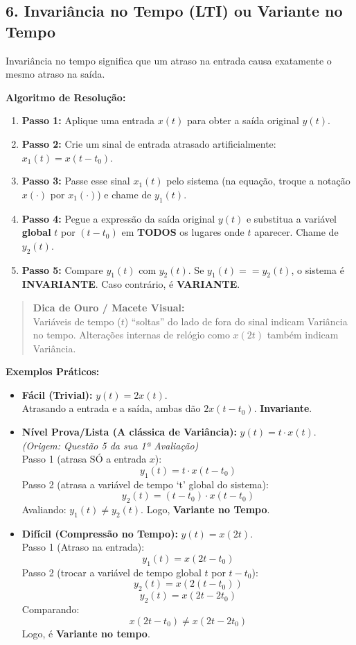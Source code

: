 \subsection{6. Invariância no Tempo (LTI) ou Variante no Tempo}\label{invariuxe2ncia-no-tempo-lti-ou-variante-no-tempo}

Invariância no tempo significa que um atraso na entrada causa exatamente o mesmo atraso na saída.

\textbf{Algoritmo de Resolução:}

\begin{enumerate}
\def\labelenumi{\arabic{enumi}.}
\tightlist
\item
  \textbf{Passo 1:} Aplique uma entrada \(x(t)\) para obter a saída original \(y(t)\).
\item
  \textbf{Passo 2:} Crie um sinal de entrada atrasado artificialmente: \(x_1(t) = x(t - t_0)\).
\item
  \textbf{Passo 3:} Passe esse sinal \(x_1(t)\) pelo sistema (na equação, troque a notação \(x(\cdot)\) por \(x_1(\cdot)\)) e chame de \(y_1(t)\).
\item
  \textbf{Passo 4:} Pegue a expressão da saída original \(y(t)\) e substitua a variável \textbf{global} \(t\) por \((t - t_0)\) em \textbf{TODOS} os lugares onde \(t\) aparecer. Chame de \(y_2(t)\).
\item
  \textbf{Passo 5:} Compare \(y_1(t)\) com \(y_2(t)\). Se \(y_1(t) == y_2(t)\), o sistema é \textbf{INVARIANTE}. Caso contrário, é \textbf{VARIANTE}.
\end{enumerate}

\begin{quote}
\textbf{Dica de Ouro / Macete Visual:}\\
Variáveis de tempo (\(t\)) ``soltas'' do lado de fora do sinal indicam Variância no tempo. Alterações internas de relógio como \(x(2t)\) também indicam Variância.
\end{quote}

\textbf{Exemplos Práticos:}

\begin{itemize}
\item
  \textbf{Fácil (Trivial):} \(y(t) = 2x(t)\).\\
  Atrasando a entrada e a saída, ambas dão \(2x(t-t_0)\). \textbf{Invariante}.
\item
  \textbf{Nível Prova/Lista (A clássica de Variância):} \(y(t) = t \cdot x(t)\).\\
  \emph{(Origem: Questão 5 da sua 1ª Avaliação)}\\
  Passo 1 (atrasa SÓ a entrada \(x\)):
  \[y_1(t) = t \cdot x(t-t_0)\]
  Passo 2 (atrasa a variável de tempo `t' global do sistema):
  \[y_2(t) = (t-t_0) \cdot x(t-t_0)\]
  Avaliando: \(y_1(t) \neq y_2(t)\). Logo, \textbf{Variante no Tempo}.
\item
  \textbf{Difícil (Compressão no Tempo):} \(y(t) = x(2t)\).\\
  Passo 1 (Atraso na entrada):
  \[y_1(t) = x(2t - t_0)\]
  Passo 2 (trocar a variável de tempo global \(t\) por \(t-t_0\)):
  \[y_2(t) = x(2(t-t_0))\]
  \[y_2(t) = x(2t - 2t_0)\]
  Comparando:
  \[x(2t - t_0) \neq x(2t - 2t_0)\]
  Logo, é \textbf{Variante no tempo}.
\end{itemize}

